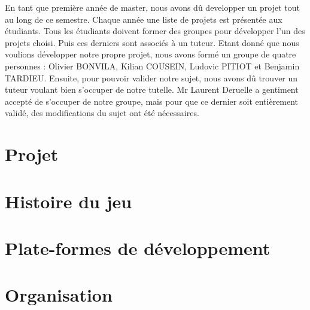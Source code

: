 En tant que première année de master, nous avons dû developper un projet tout au long de ce semestre. Chaque année une liste de projets est présentée aux étudiants. Tous les étudiants doivent former des groupes pour développer l'un des projets choisi. Puis ces derniers sont associés à un tuteur. Etant donné que nous voulions développer notre propre projet, nous avons formé un groupe de quatre personnes : Olivier BONVILA, Kilian COUSEIN, Ludovic PITIOT et Benjamin TARDIEU. Ensuite, pour pouvoir valider notre sujet, nous avons dû trouver un tuteur voulant bien s'occuper de notre tutelle. Mr Laurent Deruelle a gentiment accepté de s'occuper de notre groupe, mais pour que ce dernier soit entièrement validé, des modifications du sujet ont été nécessaires.

\section{Projet}	
	
	
\section{Histoire du jeu}
	

\section{Plate-formes de développement}
	
	
\section{Organisation}
	
